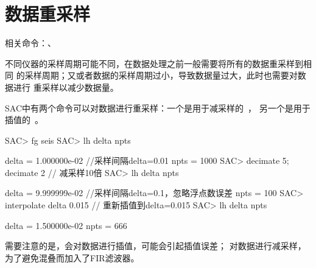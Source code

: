 \section{数据重采样}
相关命令：、

不同仪器的采样周期可能不同，在数据处理之前一般需要将所有的数据重采样到相同
的采样周期；又或者数据的采样周期过小，导致数据量过大，此时也需要对数据进行
重采样以减少数据量。

SAC中有两个命令可以对数据进行重采样：一个是用于减采样的~，
另一个是用于插值的~。

\begin{SACCode}
SAC> fg seis
SAC> lh delta npts

     delta = 1.000000e-02       //采样间隔delta=0.01
      npts = 1000
SAC> decimate 5; decimate 2     // 减采样10倍
SAC> lh delta npts

     delta = 9.999999e-02       //采样间隔delta=0.1，忽略浮点数误差
      npts = 100
SAC> interpolate delta 0.015    // 重新插值到delta=0.015
SAC> lh delta npts

     delta = 1.500000e-02
      npts = 666
\end{SACCode}

需要注意的是，会对数据进行插值，可能会引起插值误差；
对数据进行减采样，为了避免混叠而加入了FIR滤波器。
